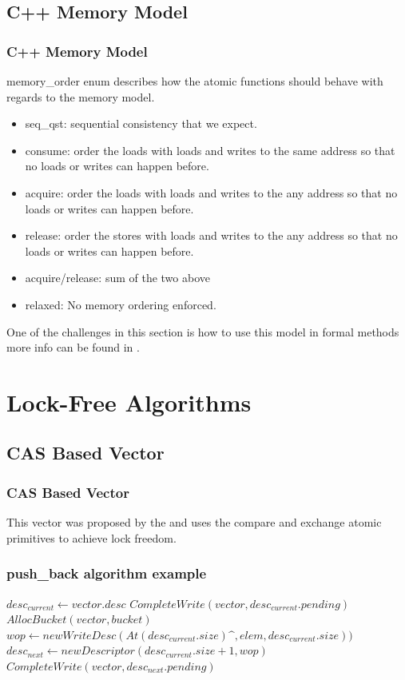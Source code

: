\documentclass{beamer}
\begin{document}
\subsection{C++ Memory Model}
\begin{frame}
    \frametitle{C++ Memory Model}
    memory\_order enum describes how the atomic functions should behave with
    regards to the memory model.
    \begin{itemize}
        \item seq\_qst: sequential consistency that we expect.
        \item consume: order the loads with loads and writes to the
            same address so that no loads or writes can happen before.
        \item acquire: order the loads with loads and writes to the
            any address so that no loads or writes can happen before.
        \item release: order the stores with loads and writes to the
            any address so that no loads or writes can happen before.
        \item acquire/release: sum of the two above
        \item relaxed: No memory ordering enforced.
    \end{itemize}

    One of the challenges in this section is how to use this model in formal
    methods more info can be found in  \cite{mckenney2017parallel}.
\end{frame}

\section{Lock-Free Algorithms}

\subsection{CAS Based Vector}
\begin{frame}
    \frametitle{CAS Based Vector}
    This vector was proposed by the \cite{dechev2006lock} and uses the compare
    and exchange atomic primitives to achieve lock freedom.
\end{frame}

\begin{frame}
    \frametitle{push\_back algorithm example}
    \begin{algorithmic}
        \Repeat
        \State $desc_{current} \gets vector.desc$
        \State $CompleteWrite(vector, desc_{current}.pending)$
        \State $AllocBucket(vector, bucket)$
        \EndIf
        \State $wop \gets new WriteDesc(At(desc_{current}.size)\^{}, elem,
        desc_{current}.size))$
        \State $desc_{next} \gets new Descriptor(desc_{current}.size + 1, wop)$
        \State $CompleteWrite(vector, desc_{next}.pending)$
    \end{algorithmic}
\end{frame}
\end{document}
